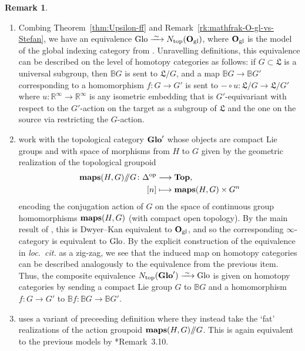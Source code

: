 \documentclass[reqno]{memo-l}
\theoremstyle{mythm}
\theoremstyle{definition}
\newtheorem{rk}[thm]{Remark}
\numberwithin{equation}{section}
\newcommand{\R} {{\mathbb{R}}}
\newcommand{\gl}{\textup{gl}}
\newcommand{\Ntop}{{N_\textup{top}}}
\newcommand{\cat}[1]{\textbf{\textup{#1}}}
\newcommand{\maps}{\cat{maps}}
\newcommand{\op}{{\textup{op}}}
\newcommand{\Glo}{\textup{Glo}}
\newcommand{\Top}{\cat{Top}}
\newcommand{\BGcat}[1]{\mathbb B{#1}}
\newcommand{\iso}{\xrightarrow{\;\smash{\raisebox{-0.25ex}{\ensuremath{\scriptstyle\sim}}}\;}}
\begin{document}
\begin{rk}\label{rk:Glo}
    \begin{enumerate}
        \item Combing Theorem~\ref{thm:Upsilon-ff} and Remark~\ref{rk:mathfrak-O-gl-vs-Stefan}, we have an equivalence $\Glo\iso\Ntop(\cat{O}_\gl)$, where $\cat{O}_\gl$ is the model of the global indexing category from \cite{schwede_orbispaces_2020}. Unravelling definitions, this equivalence can be described on the level of homotopy categories as follows: if $G\subset\mathfrak L$ is a universal subgroup, then $\BGcat{G}$ is sent to $\mathfrak L/G$, and a map $\BGcat{G}\to\BGcat{G'}$ corresponding to a homomorphism $f\colon G\to G'$ is sent to $-\circ u\colon\mathfrak L/G\to\mathfrak L/G'$ where $u\colon\R^\infty\to\R^\infty$ is any isometric embedding that is $G'$-equivariant with respect to the $G'$-action on the target as a subgroup of $\mathfrak L$ and the one on the source via restricting the $G$-action. 
        \item \cites{rezk2014global,LNP} work with the topological category $\cat{Glo}'$ whose objects are compact Lie groups and with space of morphisms from $H$ to $G$ given by the geometric realization of the topological groupoid 
        \begin{align*} \maps(H,G)/\hskip-3pt/G\colon \Delta^{\op}&\longrightarrow \Top,\,\\ [n] &\longmapsto \maps(H,G)\times G^n\end{align*} encoding the conjugation action of $G$ on the space of continuous group homomorphisms $\maps(H,G)$ (with compact open topology). 
        By the main result of \cite{koerschgen}, this is Dwyer--Kan equivalent to $\cat{O}_\gl$, and so the corresponding $\infty$-category is equivalent to $\Glo$. By the explicit construction of the equivalence in \emph{loc.\ cit.} as a zig-zag, we see that the induced map on homotopy categories can be described analogously to the equivalence from the previous item. Thus, the composite equivalence $\Ntop(\cat{Glo}')\iso\Glo$ is given on homotopy categories by sending a compact Lie group $G$ to $\BGcat{G}$ and a homomorphism $f\colon G\to G'$ to $\BGcat{f}\colon\BGcat{G}\to\BGcat{G'}$.
        \item \cite{gepnerhenriques2007orbispaces} uses a variant of preceeding definition where they instead take the `fat' realizations of the action groupoid $\maps(H,G)/\hskip-3pt/G$. 
        This is again equivalent to the previous models by \cite{koerschgen}*{Remark~3.10}. 
    \end{enumerate}
\end{rk}
\end{document}
